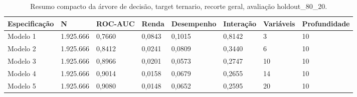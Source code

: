 \begin{table}
\caption{Resumo compacto da árvore de decisão, target ternario, recorte geral, avaliação holdout_80_20.}
\label{tab:tabela_compacta_treeClassification_10_profundidade_ternario_recorte_geral_holdout_80_20}
\begin{tabular}{llllllll}
\toprule
Especificação & N & ROC-AUC & Renda & Desempenho & Interação & Variáveis & Profundidade \\
\midrule
Modelo 1 & 1.925.666 & 0,7660 & 0,0843 & 0,1015 & 0,8142 & 3 & 10 \\
Modelo 2 & 1.925.666 & 0,8412 & 0,0241 & 0,0809 & 0,3440 & 6 & 10 \\
Modelo 3 & 1.925.666 & 0,8966 & 0,0201 & 0,0573 & 0,2747 & 10 & 10 \\
Modelo 4 & 1.925.666 & 0,9014 & 0,0158 & 0,0679 & 0,2655 & 14 & 10 \\
Modelo 5 & 1.925.666 & 0,9080 & 0,0148 & 0,0652 & 0,2595 & 20 & 10 \\
\bottomrule
\end{tabular}
\end{table}
